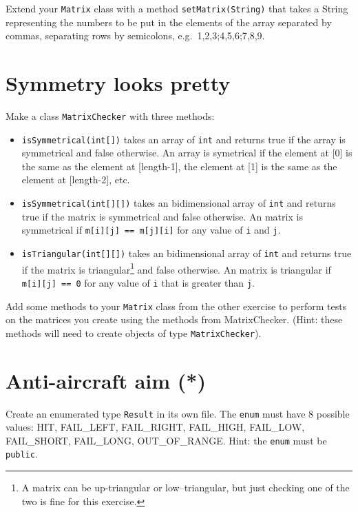 \documentclass{article}
\begin{document}
Extend your \verb+Matrix+ class with a method \verb+setMatrix(String)+
that takes a String representing the numbers to be put in the elements
of the array separated by commas, separating rows by semicolons,
e.g.~1,2,3;4,5,6;7,8,9. 

\section{Symmetry looks pretty}
\label{sec:symm-looks-pretty}

Make a class \verb+MatrixChecker+ with three methods: 

\begin{itemize}
\item \verb+isSymmetrical(int[])+ takes an array of \verb+int+ and
  returns true if the array is symmetrical and false otherwise. An
  array is symetrical if the element at [0] is the same as the
  element at [length-1], the element at [1] is the same as the
  element at [length-2], etc.
\item \verb+isSymmetrical(int[][])+ takes an bidimensional array of
  \verb+int+ and returns true if the matrix is symmetrical and false
  otherwise. An matrix is symmetrical if \verb+m[i][j] == m[j][i]+ for
  any value of \verb+i+ and \verb+j+.
\item \verb+isTriangular(int[][])+ takes an bidimensional array of
  \verb+int+ and returns true if the matrix is triangular\footnote{A
    matrix can be up-triangular or low--triangular, but just checking
    one of the two is fine for this exercise.} and false
  otherwise. An matrix is triangular if \verb+m[i][j] == 0+ for
  any value of \verb+i+ that is greater than \verb+j+.
\end{itemize}

Add some methods to your \verb+Matrix+ class from the other exercise to
perform tests on the matrices you create using the methods from
MatrixChecker. (Hint: these methods will need to create objects of
type \verb+MatrixChecker+). 


\section{Anti-aircraft aim (*)}
\label{sec:anti-aircraft-aim}

Create an enumerated type \verb+Result+ in its own file. The
\verb+enum+ must have 8 possible values: HIT, FAIL\_LEFT, FAIL\_RIGHT,
FAIL\_HIGH, FAIL\_LOW, FAIL\_SHORT, FAIL\_LONG, OUT\_OF\_RANGE. Hint:
the \verb+enum+ must be \verb+public+.
\end{document}

